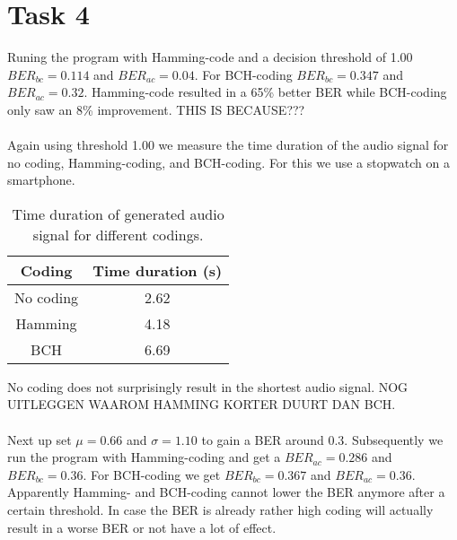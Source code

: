 \documentclass[final]{scrreprt} %
\begin{document}
\chapter*{Task 4}
Runing the program with Hamming-code and a decision threshold of  1.00 $BER_{bc} = 0.114$ and $BER_{ac} = 0.04$.
For BCH-coding $BER_{bc} = 0.347$ and $BER_{ac} = 0.32$. Hamming-code resulted in a 65\% better BER while BCH-coding only saw an 8\% improvement. THIS IS BECAUSE???\\\\
Again using threshold 1.00 we measure the time duration of the audio signal for no coding, Hamming-coding, and BCH-coding. For this we use a stopwatch on a smartphone.

\begin{table}[H]
\begin{center}
\begin{tabular}{| c | c |}
\hline
Coding & Time duration (s)\\
\hline
No coding & 2.62\\
\hline
Hamming & 4.18\\
\hline
BCH & 6.69\\
\hline
\end{tabular}
\end{center}
\caption{Time duration of generated audio signal for different codings.}
\end{table}

No coding does not surprisingly result in the shortest audio signal. NOG UITLEGGEN WAAROM HAMMING KORTER DUURT DAN BCH.\\\\
Next up set $\mu = 0.66$ and $\sigma = 1.10$ to gain a BER around 0.3. Subsequently we run the program with Hamming-coding and get a $BER_{ac} = 0.286$ and $BER_{bc} = 0.36$. For BCH-coding we get $BER_{bc} =   0.367$ and $BER_{ac} = 0.36$. Apparently Hamming- and BCH-coding cannot lower the BER anymore after a certain threshold. In case the BER is already rather high coding will actually result in a worse BER or not have a lot of effect.
\end{document}
